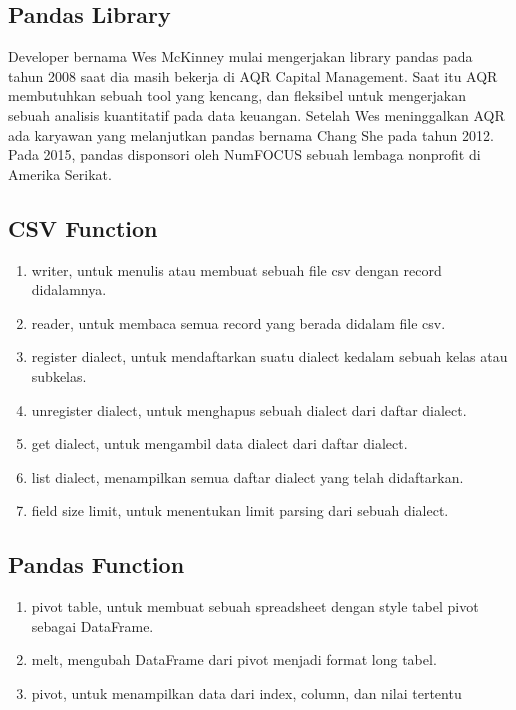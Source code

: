 \subsection{Pandas Library}
Developer bernama Wes McKinney mulai mengerjakan library pandas pada tahun 2008 saat dia masih bekerja di AQR Capital Management. Saat itu AQR membutuhkan sebuah tool yang kencang, dan fleksibel untuk mengerjakan sebuah analisis kuantitatif pada data keuangan. Setelah Wes meninggalkan AQR ada karyawan yang melanjutkan pandas bernama Chang She pada tahun 2012. Pada 2015, pandas disponsori oleh NumFOCUS sebuah lembaga nonprofit di Amerika Serikat.

\subsection{CSV Function}
\begin{enumerate}
\item writer, untuk menulis atau membuat sebuah file csv dengan record didalamnya.
\item reader, untuk membaca semua record yang berada didalam file csv.
\item register dialect, untuk mendaftarkan suatu dialect kedalam sebuah kelas atau subkelas.
\item unregister dialect, untuk menghapus sebuah dialect dari daftar dialect.
\item get dialect, untuk mengambil data dialect dari daftar dialect.
\item list dialect, menampilkan semua daftar dialect yang telah didaftarkan.
\item field size limit, untuk menentukan limit parsing dari sebuah dialect.
\end{enumerate}

\subsection{Pandas Function}
\begin{enumerate}
\item pivot table, untuk membuat sebuah spreadsheet dengan style tabel pivot sebagai DataFrame.
\item melt, mengubah DataFrame dari pivot menjadi format long tabel.
\item pivot, untuk menampilkan data dari index, column, dan nilai tertentu
\end{enumerate}